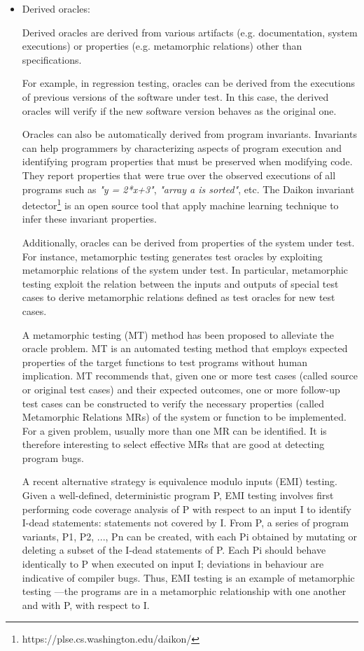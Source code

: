 \begin{itemize}
\item Derived oracles:

Derived oracles are derived from various artifacts (e.g. documentation, system executions) or properties (e.g. metamorphic relations) other than specifications.

For example, in regression testing, oracles can be derived from the executions of previous versions of the software under test. In this
case, the derived oracles will verify if the new software version behaves as the original one\cite{mariani2007compatibility}. 
 
Oracles can also be automatically derived from program invariants\cite{ernst2000quickly}. Invariants can help programmers by characterizing aspects of program execution and identifying program properties that must be preserved when modifying code. They report properties that were true over the observed executions of all programs such as \textit{"y = 2*x+3"}, \textit{"array a is sorted"}, etc. The Daikon invariant detector\footnote{https://plse.cs.washington.edu/daikon/} is an open source tool that apply machine learning technique to infer these invariant properties.

Additionally, oracles can be derived from properties of the system under test. For instance, metamorphic testing\cite{chen2004case} generates test oracles by exploiting metamorphic relations of the system under test. In particular, metamorphic testing exploit the relation between the inputs and outputs of special test cases to derive metamorphic relations defined as test oracles for new test cases. 

A metamorphic testing (MT) method has been proposed to alleviate the oracle problem\cite{chen2004case}. MT is an automated testing method that employs expected properties of the target functions to test programs without human implication. 
MT recommends that, given one or more test cases (called source or original test cases) and their expected outcomes, one or more follow-up test cases can be constructed to verify the necessary properties (called Metamorphic Relations MRs) of the system or function to be implemented.
For a given problem, usually more than one MR can be identified. It is therefore interesting to select effective MRs that are good at detecting program bugs.

A recent alternative strategy is equivalence modulo inputs (EMI) testing. Given a well-defined, deterministic program P, EMI testing involves first performing code coverage analysis of P with respect to an input I to identify I-dead statements: statements not covered by I. From P, a series of program variants, P1, P2, ..., Pn can be created, with each Pi obtained by mutating or deleting a subset of the I-dead
statements of P. Each Pi should behave identically to P
when executed on input I; deviations in behaviour are indicative
of compiler bugs. Thus, EMI testing is an example
of metamorphic testing —the programs are in a metamorphic
relationship with one another and with P, with respect
to I.




\end{itemize}
